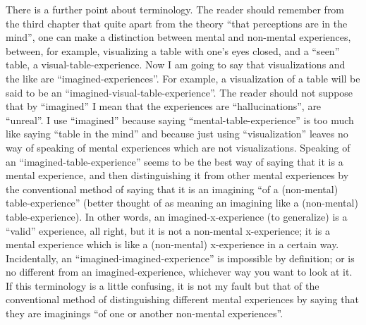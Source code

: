 There is a further point about terminology. The reader should 
remember from the third chapter that quite apart from the theory \enquote{that 
perceptions are in the mind}, one can make a distinction between mental 
and non-mental experiences, between, for example, visualizing a table with 
one's eyes closed, and a \enquote{seen} table, a visual-table-experience. Now I am 
going to say that visualizations and the like are \enquote{imagined-experiences}. For 
example, a visualization of a table will be said to be an 
\enquote{imagined-visual-table-experience}. The reader should not suppose that by 
\enquote{imagined} I mean that the experiences are 
\enquote{hallucinations}, are \enquote{unreal}. I 
use \enquote{imagined} because saying \enquote{mental-table-experience} is too much like 
saying \enquote{table in the mind} and because just using \enquote{visualization} leaves no way 
of speaking of mental experiences which are not visualizations. Speaking of 
an \enquote{imagined-table-experience} seems to be the best way of saying that it is 
a mental experience, and then distinguishing it from other mental 
experiences by the conventional method of saying that it is an imagining \enquote{of 
a (non-mental) table-experience} (better thought of as meaning an imagining 
like a  (non-mental)  table-experience). In other words, an 
imagined-x-experience (to generalize) is a \enquote{valid} experience, all right, but it 
is not a non-mental x-experience; it is a mental experience which is like a 
(non-mental) x-experience in a certain way. Incidentally, an \enquote{imagined-imagined-experience} is impossible by definition; or is no different from an 
imagined-experience, whichever way you want to look at it. If this 
terminology is a little confusing, it is not my fault but that of the 
conventional method of distinguishing different mental experiences by 
saying that they are imaginings \enquote{of one or another non-mental experiences}. 


